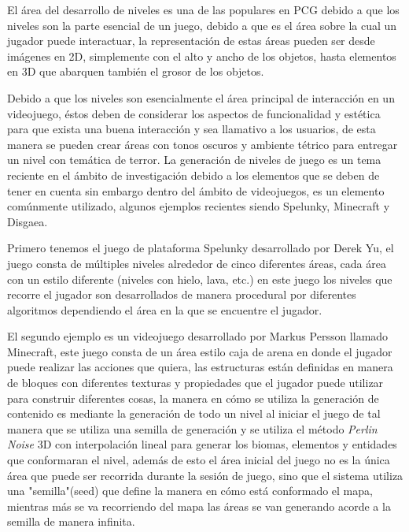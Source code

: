 El área del desarrollo de niveles es una de las populares en PCG debido a que
los niveles son la parte esencial de un juego, debido a que es el área sobre la
cual un jugador puede interactuar, la representación de estas áreas pueden ser 
desde imágenes en 2D, simplemente con el alto y ancho de los objetos, hasta
elementos en 3D que abarquen también el grosor de los objetos.

Debido a que los niveles son esencialmente el área principal de interacción en
un videojuego, éstos deben de considerar los aspectos de funcionalidad y estética
para que exista una buena interacción y sea llamativo a los usuarios, de esta
manera se pueden crear áreas con tonos oscuros y ambiente tétrico para entregar
un nivel con temática de terror. La generación de niveles de juego es un tema
reciente en el ámbito de investigación debido a los elementos que se deben de
tener en cuenta sin embargo dentro del ámbito de videojuegos, es un elemento
comúnmente utilizado, algunos ejemplos recientes siendo Spelunky, Minecraft y
Disgaea. %

Primero tenemos el juego de plataforma Spelunky desarrollado por Derek Yu, el
juego consta de múltiples niveles alrededor de cinco diferentes áreas, cada área
con un estilo diferente (niveles con hielo, lava, etc.) en este juego los niveles
que recorre el jugador son desarrollados de manera procedural por diferentes
algoritmos dependiendo el área en la que se encuentre el jugador.%

El segundo ejemplo es un videojuego desarrollado por Markus Persson llamado %
Minecraft, este juego consta de un área estilo caja de arena en donde el jugador
puede realizar las acciones que quiera, las estructuras están definidas en
manera de bloques con diferentes texturas y propiedades que el jugador puede
utilizar para construir diferentes cosas, la manera en cómo se utiliza la
generación de contenido es mediante la generación de todo un nivel al iniciar el
juego de tal manera que se utiliza una semilla de generación y se utiliza el
método \textit{Perlin Noise} 3D con interpolación lineal para generar los biomas,
elementos y entidades que conformaran el nivel, además de esto el área inicial
del juego no es la única área que puede ser recorrida durante la sesión de
juego, sino que el sistema utiliza una "semilla"(seed) que define la manera en
cómo está conformado el mapa, mientras más se va recorriendo del mapa las áreas
se van generando acorde a la semilla de manera infinita.

